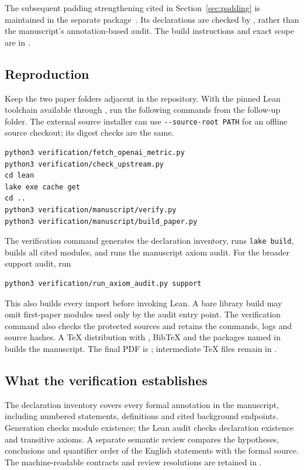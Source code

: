 The subsequent padding strengthening cited in Section~\ref{sec:padding}
is maintained in the separate  package~\cite{PaddingMemo2026}.
Its declarations are checked by , rather than
the manuscript's annotation-based audit. The build instructions and exact
scope are in .

\subsection{Reproduction}

Keep the two paper folders adjacent in the repository. With the pinned Lean
toolchain available through , run the following commands from the
follow-up folder. The external source installer can use
\texttt{-{}-source-root PATH} for an offline source checkout; its digest checks
are the same.
\begin{verbatim}
python3 verification/fetch_openai_metric.py
python3 verification/check_upstream.py
cd lean
lake exe cache get
cd ..
python3 verification/manuscript/verify.py
python3 verification/manuscript/build_paper.py
\end{verbatim}
The verification command generates the declaration inventory, runs
\texttt{lake build}, builds all cited modules, and runs the manuscript axiom
audit. For the broader support audit, run
\begin{verbatim}
python3 verification/run_axiom_audit.py support
\end{verbatim}
This also builds every import before invoking Lean. A bare library build may omit
first-paper modules used only by the audit entry point.
The verification command also checks the protected sources and retains the commands, logs and
source hashes. A TeX distribution with , BibTeX and
the packages named in  builds the manuscript. The final
PDF is ; intermediate TeX files remain in
.

\subsection{What the verification establishes}

The declaration inventory covers every formal annotation in the manuscript,
including numbered statements, definitions and cited background endpoints. Generation checks module existence;
the Lean audit checks declaration existence and transitive axioms. A separate
semantic review compares the hypotheses, conclusions and quantifier order of
the English statements with the formal source. The machine-readable contracts
and review resolutions are retained in .

